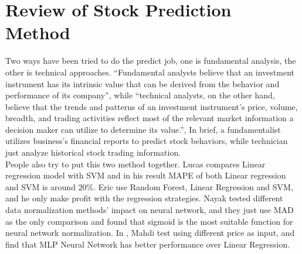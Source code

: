 \section{Review of Stock Prediction Method}

Two ways have been tried to do the predict job, one is fundamental analysis, the other is technical approaches\cite{1_edwardsmagee_1997}. “Fundamental analysts believe that an investment instrument has its intrinsic value that can be derived from the behavior and performance of its company”, while “technical analysts, on the other hand, believe that the trends and patterns of an investment instrument’s price, volume, breadth, and trading activities reflect most of the relevant market information a decision maker can utilize to determine its value.”\cite{lam2004neural}, In brief, a fundamentalist utilizes business’s financial reports to predict stock behaviors, while technician just analyze historical stock trading information.\\

People also try to put this two method together. Lucas\cite{nunnostock} compares Linear regression model with SVM and in his result MAPE of both Linear regression and SVM is around 20\%. Eric\cite{alexanderstock} use Random Forest, Linear Regression and SVM, and he only make profit with the regression strategies. Nayak\cite{nayak2014impact} tested different data normalization methods’ impact on neural network, and they just use MAD as the only comparison and found that sigmoid is the most suitable function for neural network normalization. In \cite{naeini2010stock}, Mahdi test using different price as input, and find that MLP Neural Network has better performance over Linear Regression.

